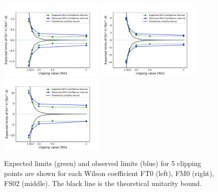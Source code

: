 \begin{figure}[ht]
    \centering
    \includegraphics[width=0.45\textwidth]{figures/aQGC/ClippedFT0CI.pdf}
    	\includegraphics[width=0.45\textwidth]{figures/aQGC/ClippedFM0CI.pdf}
    	\includegraphics[width=0.45\textwidth]{figures/aQGC/ClippedFS02CI.pdf}
        \caption{Expected limits (green) and observed limits (blue) for 5 clipping points are shown for each Wilson coefficient FT0 (left), FM0 (right), FS02 (middle). The black line is the theoretical unitarity bound.}
        \label{fig:aQGClimits}
\end{figure}